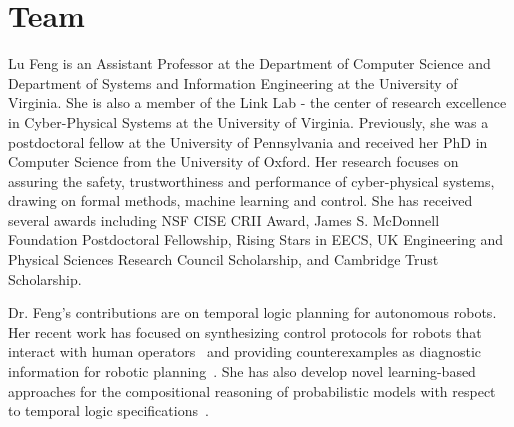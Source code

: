 \section{Team}
\label{sec:team}

Lu Feng is an Assistant Professor at the Department of Computer Science and Department of Systems and Information Engineering at the University of Virginia. She is also a member of the Link Lab - the center of research excellence in Cyber-Physical Systems at the University of Virginia. Previously, she was a postdoctoral fellow at the University of Pennsylvania and received her PhD in Computer Science from the University of Oxford. Her research focuses on assuring the safety, trustworthiness and performance of cyber-physical systems, drawing on formal methods, machine learning and control. She has received several awards including NSF CISE CRII Award, James S. McDonnell Foundation Postdoctoral Fellowship, Rising Stars in EECS, UK Engineering and Physical Sciences Research Council Scholarship, and Cambridge Trust Scholarship.

Dr. Feng's contributions are on temporal logic planning for autonomous robots. Her recent work has focused on synthesizing control protocols for robots that interact with human operators~\cite{feng2016synthesis,feng2015controller} and providing counterexamples as diagnostic information for robotic planning~\cite{feng2018cex,feng2016human}.
She has also develop novel learning-based approaches for the compositional reasoning of probabilistic models with respect to temporal logic specifications~\cite{feng2013learning,feng2011learning,feng2011automated,feng2010compositional}.
